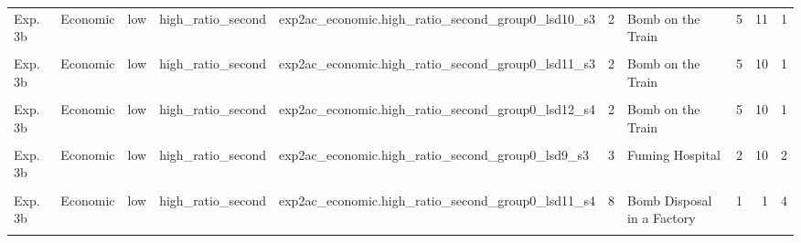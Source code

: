 \documentclass[
]{article}
\begin{document}
\begin{longtable}[t]{lllllrlrrr}
Exp. 3b & Economic & low & high\_ratio\_second & exp2ac\_economic.high\_ratio\_second\_group0\_lsd10\_s3 & 2 & Bomb on the Train & 5 & 11 & 1\\
\addlinespace
\cellcolor{gray!10}{Exp. 3b} & \cellcolor{gray!10}{Economic} & \cellcolor{gray!10}{low} & \cellcolor{gray!10}{high\_ratio\_second} & \cellcolor{gray!10}{exp2ac\_economic.high\_ratio\_second\_group0\_lsd11\_s1} & \cellcolor{gray!10}{2} & \cellcolor{gray!10}{Bomb on the Train} & \cellcolor{gray!10}{5} & \cellcolor{gray!10}{4} & \cellcolor{gray!10}{1}\\
Exp. 3b & Economic & low & high\_ratio\_second & exp2ac\_economic.high\_ratio\_second\_group0\_lsd11\_s3 & 2 & Bomb on the Train & 5 & 10 & 1\\
\cellcolor{gray!10}{Exp. 3b} & \cellcolor{gray!10}{Economic} & \cellcolor{gray!10}{low} & \cellcolor{gray!10}{high\_ratio\_second} & \cellcolor{gray!10}{exp2ac\_economic.high\_ratio\_second\_group0\_lsd11\_s5} & \cellcolor{gray!10}{2} & \cellcolor{gray!10}{Bomb on the Train} & \cellcolor{gray!10}{5} & \cellcolor{gray!10}{10} & \cellcolor{gray!10}{1}\\
Exp. 3b & Economic & low & high\_ratio\_second & exp2ac\_economic.high\_ratio\_second\_group0\_lsd12\_s4 & 2 & Bomb on the Train & 5 & 10 & 1\\
\cellcolor{gray!10}{Exp. 3b} & \cellcolor{gray!10}{Economic} & \cellcolor{gray!10}{low} & \cellcolor{gray!10}{high\_ratio\_second} & \cellcolor{gray!10}{exp2ac\_economic.high\_ratio\_second\_group0\_lsd10\_s4} & \cellcolor{gray!10}{3} & \cellcolor{gray!10}{Fuming Hospital} & \cellcolor{gray!10}{2} & \cellcolor{gray!10}{1} & \cellcolor{gray!10}{2}\\
\addlinespace
Exp. 3b & Economic & low & high\_ratio\_second & exp2ac\_economic.high\_ratio\_second\_group0\_lsd9\_s3 & 3 & Fuming Hospital & 2 & 10 & 2\\
\cellcolor{gray!10}{Exp. 3b} & \cellcolor{gray!10}{Economic} & \cellcolor{gray!10}{low} & \cellcolor{gray!10}{high\_ratio\_second} & \cellcolor{gray!10}{exp2ac\_economic.high\_ratio\_second\_group0\_lsd9\_s4} & \cellcolor{gray!10}{4} & \cellcolor{gray!10}{Blitz} & \cellcolor{gray!10}{1} & \cellcolor{gray!10}{1} & \cellcolor{gray!10}{3}\\
Exp. 3b & Economic & low & high\_ratio\_second & exp2ac\_economic.high\_ratio\_second\_group0\_lsd11\_s4 & 8 & Bomb Disposal in a Factory & 1 & 1 & 4\\
\cellcolor{gray!10}{Exp. 3b} & \cellcolor{gray!10}{Economic} & \cellcolor{gray!10}{low} & \cellcolor{gray!10}{high\_ratio\_second} & \cellcolor{gray!10}{exp2ac\_economic.high\_ratio\_second\_group0\_lsd6\_s5} & \cellcolor{gray!10}{12} & \cellcolor{gray!10}{Forced Siege} & \cellcolor{gray!10}{1} & \cellcolor{gray!10}{1} & \cellcolor{gray!10}{10}\\

\end{longtable}
\end{document}
